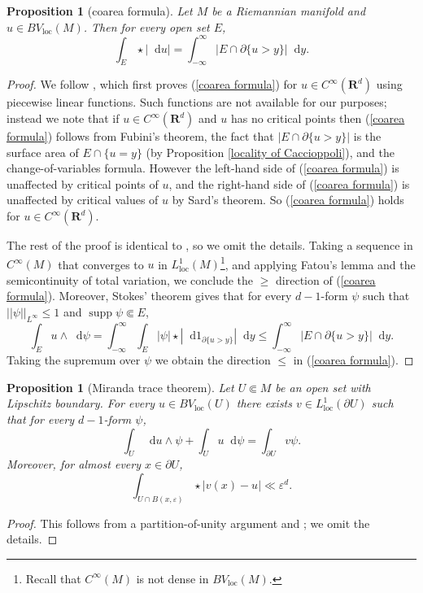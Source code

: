 \documentclass[reqno,10pt]{amsart}
\newcommand{\RR}{\mathbf{R}}
\DeclareMathOperator{\supp}{supp}
\newcommand*\dif{\mathop{}\!\mathrm{d}}
\newcommand{\loc}{\mathrm{loc}}
\newtheorem{proposition}[theorem]{Proposition}
\theoremstyle{definition}
\numberwithin{equation}{section}
\begin{document}
\begin{proposition}[coarea formula]\label{Coarea2}
Let $M$ be a Riemannian manifold and $u \in BV_\loc(M)$. Then for every open set $E$,
\begin{equation}\label{coarea formula}
\int_E \star |\dif u| = \int_{-\infty}^\infty |E \cap \partial \{u > y\}| \dif y.
\end{equation}
\end{proposition}
\begin{proof}
We follow \cite[Theorem 1.23]{Giusti77}, which first proves (\ref{coarea formula}) for $u \in C^\infty(\RR^d)$ using piecewise linear functions.
Such functions are not available for our purposes; instead we note that if $u \in C^\infty(\RR^d)$ and $u$ has no critical points then (\ref{coarea formula}) follows from Fubini's theorem, the fact that $|E \cap \partial \{u > y\}|$ is the surface area of $E \cap \{u = y\}$ (by Proposition \ref{locality of Caccioppoli}), and the change-of-variables formula.
However the left-hand side of (\ref{coarea formula}) is unaffected by critical points of $u$, and the right-hand side of (\ref{coarea formula}) is unaffected by critical values of $u$ by Sard's theorem.
So (\ref{coarea formula}) holds for $u \in C^\infty(\RR^d)$.

The rest of the proof is identical to \cite[Theorem 1.23]{Giusti77}, so we omit the details.
Taking a sequence in $C^\infty(M)$ that converges to $u$ in $L^1_\loc(M)$\footnote{Recall that $C^\infty(M)$ is not dense in $BV_\loc(M)$.}, and applying Fatou's lemma and the semicontinuity of total variation, we conclude the $\geq$ direction of (\ref{coarea formula}).
Moreover, Stokes' theorem gives that for every $d-1$-form $\psi$ such that $||\psi||_{L^\infty} \leq 1$ and $\supp \psi \Subset E$,
$$\int_E u \wedge \dif \psi = \int_{-\infty}^\infty \int_E |\psi| \star |\dif 1_{\partial \{u > y\}}| \dif y \leq \int_{-\infty}^\infty |E \cap \partial \{u > y\}| \dif y.$$
Taking the supremum over $\psi$ we obtain the direction $\leq$ in (\ref{coarea formula}).
\end{proof}

\begin{proposition}[Miranda trace theorem]\label{traces}
Let $U \Subset M$ be an open set with Lipschitz boundary.
For every $u \in BV_\loc(U)$ there exists $v \in L^1_\loc(\partial U)$ such that for every $d-1$-form $\psi$,
\begin{equation}\label{Miranda IBP}
\int_U \dif u \wedge \psi + \int_U u \dif \psi = \int_{\partial U} v\psi.
\end{equation}
Moreover, for almost every $x \in \partial U$,
\begin{equation}\label{convergence of trace}
\int_{U \cap B(x, \varepsilon)} \star |v(x) - u| \ll \varepsilon^d.
\end{equation}
\end{proposition}
\begin{proof}
This follows from a partition-of-unity argument and \cite[Teorema 1]{Miranda67}; we omit the details.
\end{proof}
\end{document}
